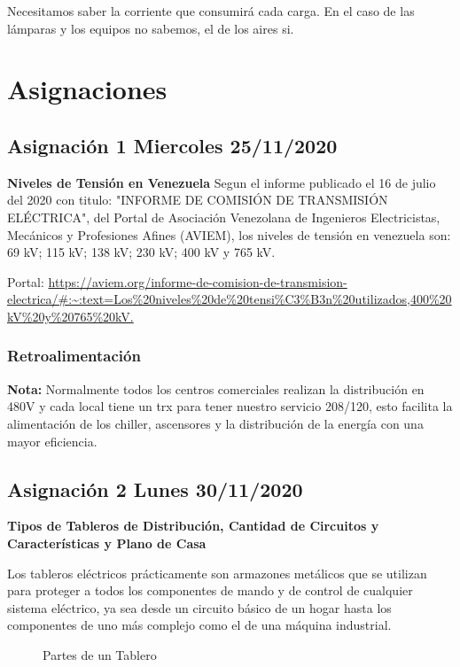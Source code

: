 \documentclass[11pt,letterpaper]{article}
\begin{document}
Necesitamos saber la corriente que consumirá cada carga. En el caso de las lámparas y los equipos no sabemos, el de los aires si.

	
\section{Asignaciones}
\subsection{Asignación 1 Miercoles 25/11/2020}
\textbf{Niveles de Tensión en Venezuela}
Segun el informe publicado el 16 de julio del 2020 con titulo: "INFORME DE COMISIÓN DE TRANSMISIÓN ELÉCTRICA", del Portal de Asociación Venezolana de Ingenieros Electricistas, Mecánicos y Profesiones Afines (AVIEM), los niveles de tensión en venezuela son: 69 kV; 115 kV; 138 kV; 230 kV; 400 kV y 765 kV.

Portal: \url{https://aviem.org/informe-de-comision-de-transmision-electrica/#:~:text=Los%20niveles%20de%20tensi%C3%B3n%20utilizados,400%20kV%20y%20765%20kV.}


\subsubsection{Retroalimentación}
\textbf{Nota:} Normalmente todos los centros comerciales realizan la distribución en 480V y cada local tiene un trx para tener nuestro servicio 208/120, esto facilita la alimentación de los chiller, ascensores y la distribución de la energía con una mayor eficiencia.\\

\subsection{Asignación 2 Lunes 30/11/2020}
\textbf{Tipos de Tableros de Distribución, Cantidad de Circuitos y Características y Plano de Casa}

	Los tableros eléctricos prácticamente son armazones metálicos que se utilizan para proteger a todos los componentes de mando y de control de cualquier sistema eléctrico, ya sea desde un circuito básico de un hogar hasta los componentes de uno más complejo como el de una máquina industrial.

\begin{figure}[ht!]
	\centering
	\caption{Partes de un Tablero}
\end{figure}
\end{document}
